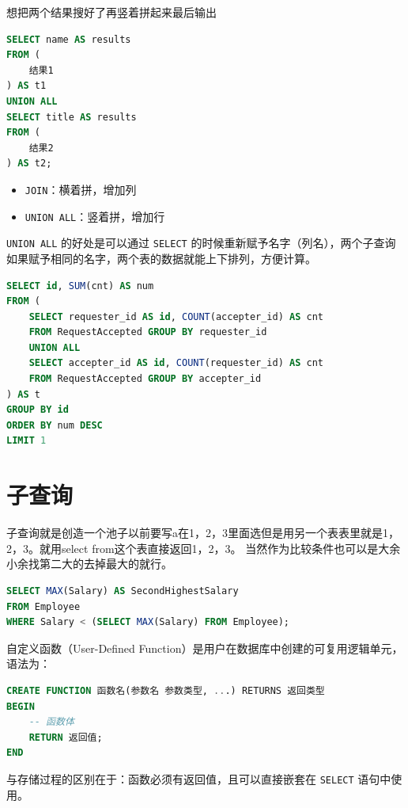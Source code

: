 想把两个结果搜好了再竖着拼起来最后输出
\begin{lstlisting}[language=SQL]
SELECT name AS results
FROM (
    结果1
) AS t1
UNION ALL
SELECT title AS results
FROM (
    结果2
) AS t2;
\end{lstlisting}
\begin{dxtips}
\begin{itemize}
    \item \texttt{JOIN}：横着拼，增加列
    \item \texttt{UNION ALL}：竖着拼，增加行
\end{itemize}
\end{dxtips}

\begin{homework}[602 | 高级查询和连接 第12题]
    \begin{note}
\texttt{UNION ALL} 的好处是可以通过 \texttt{SELECT} 的时候重新赋予名字（列名），两个子查询如果赋予相同的名字，两个表的数据就能上下排列，方便计算。

\begin{lstlisting}[language=SQL]
SELECT id, SUM(cnt) AS num
FROM (
    SELECT requester_id AS id, COUNT(accepter_id) AS cnt
    FROM RequestAccepted GROUP BY requester_id
    UNION ALL
    SELECT accepter_id AS id, COUNT(requester_id) AS cnt
    FROM RequestAccepted GROUP BY accepter_id
) AS t
GROUP BY id
ORDER BY num DESC
LIMIT 1
\end{lstlisting}
\end{note}
\end{homework}

\section{子查询}
子查询就是创造一个池子以前要写a在1，2，3里面选但是用另一个表表里就是1，2，3。就用select from这个表直接返回1，2，3。
当然作为比较条件也可以是大余小余找第二大的去掉最大的就行。

\begin{homework}[176 | 高级字符串函数 第4题]
\begin{lstlisting}[language=SQL]
SELECT MAX(Salary) AS SecondHighestSalary
FROM Employee
WHERE Salary < (SELECT MAX(Salary) FROM Employee);
\end{lstlisting}
\end{homework}

\begin{definition}
自定义函数（User-Defined Function）是用户在数据库中创建的可复用逻辑单元，语法为：

\begin{lstlisting}[language=SQL, frame=single, backgroundcolor=\color{white}]
CREATE FUNCTION 函数名(参数名 参数类型, ...) RETURNS 返回类型
BEGIN
    -- 函数体
    RETURN 返回值;
END
\end{lstlisting}

与存储过程的区别在于：函数必须有返回值，且可以直接嵌套在 \texttt{SELECT} 语句中使用。
\end{definition}

